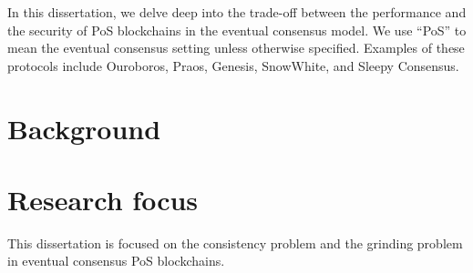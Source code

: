 In this dissertation, 
we delve deep into the trade-off between the performance and the security of PoS blockchains 
in the eventual consensus model. 
We use ``PoS'' to mean the eventual consensus setting 
unless otherwise specified.
Examples of these protocols include Ouroboros, Praos, Genesis, SnowWhite, 
and Sleepy Consensus.






\section{Background}\label{sec:background-intro}




\section{Research focus}\label{sec:intro-focus}
This dissertation is focused on the consistency problem and the grinding problem in 
eventual consensus PoS blockchains. 

